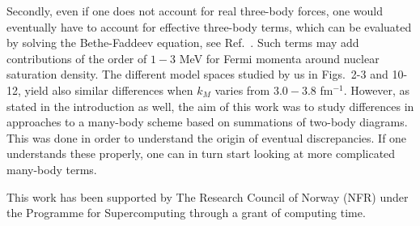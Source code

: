 Secondly, even if one does not account for real three-body
forces, one would eventually have to account for effective 
three-body terms, which can be evaluated by 
solving the Bethe-Faddeev equation, see Ref.\ \cite{day81}.
Such terms may add contributions of the order of
$1-3$ MeV for Fermi momenta around nuclear saturation density.
The different model spaces studied by us in Figs.\
2-3 and 10-12, yield also
similar differences when $k_M$ varies from $3.0-3.8$ 
fm$^{-1}$. However, as stated in the introduction as well,
the aim of this work
was to study differences in approaches to a many-body scheme 
based on summations of two-body diagrams. This was done 
in order
to understand the origin of eventual discrepancies.
If one understands these properly, one can in turn start
looking at more complicated many-body terms.  

\begin{ack}
This work has been supported 
by The Research Council of Norway (NFR) under the Programme for Supercomputing 
through a grant of computing time.
\end{ack}




